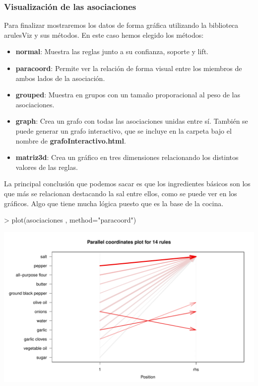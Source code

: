 \documentclass [a4paper] {article}
\begin{document}
\subsubsection{Visualización de las asociaciones}
Para finalizar mostraremos los datos de forma gráfica utilizando la biblioteca arulesViz y sus métodos. 
En este caso hemos elegido los métodos: 
\begin{itemize}
    \item \textbf{normal}: Muestra las reglas junto a su confianza, soporte y lift.
	\item \textbf{paracoord}: Permite ver la relación de forma visual entre los miembros de ambos lados de la asociación.
	\item \textbf{grouped}: Muestra en grupos con un tamaño proporacional al peso de las asociaciones.
	\item \textbf{graph}: Crea un grafo con todas las asociaciones unidas entre sí. También se puede generar un grafo interactivo, que se incluye en la carpeta
    bajo el nombre de \textbf{grafoInteractivo.html}.
    \item \textbf{matriz3d}: Crea un gráfico en tres dimensiones relacionando los distintos valores de las reglas.
\end{itemize}
La principal conclusión que podemos sacar es que los ingredientes básicos son los que más se relacionan destacando la sal entre ellos, como
se puede ver en los gráficos. Algo que tiene mucha lógica puesto que es la base de la cocina.
\begin{Schunk}
\begin{Sinput}
> plot(asociaciones , method="paracoord")
\end{Sinput}
\end{Schunk}
\includegraphics{Practica2-asociaciones}
\end{document}

